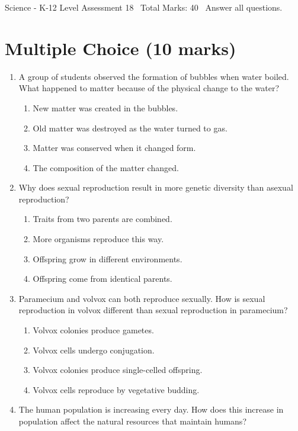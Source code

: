 \documentclass[12pt]{article}
\begin{document}
\begin{center}
Science - K-12 Level Assessment 18 \
Total Marks: 40 \
Answer all questions.
\end{center}

\section*{Multiple Choice (10 marks)}
\begin{enumerate}[label=\arabic*.]
\item A group of students observed the formation of bubbles when water boiled. What happened to matter because of the physical change to the water?
\begin{enumerate}[label=(\alph*)]
    \item New matter was created in the bubbles.
    \item Old matter was destroyed as the water turned to gas.
    \item Matter was conserved when it changed form.
    \item The composition of the matter changed.
\end{enumerate}
\item Why does sexual reproduction result in more genetic diversity than asexual reproduction?
\begin{enumerate}[label=(\alph*)]
    \item Traits from two parents are combined.
    \item More organisms reproduce this way.
    \item Offspring grow in different environments.
    \item Offspring come from identical parents.
\end{enumerate}
\item Paramecium and volvox can both reproduce sexually. How is sexual reproduction in volvox different than sexual reproduction in paramecium?
\begin{enumerate}[label=(\alph*)]
    \item Volvox colonies produce gametes.
    \item Volvox cells undergo conjugation.
    \item Volvox colonies produce single-celled offspring.
    \item Volvox cells reproduce by vegetative budding.
\end{enumerate}
\item The human population is increasing every day. How does this increase in population affect the natural resources that maintain humans?

\end{enumerate}
\end{document}
